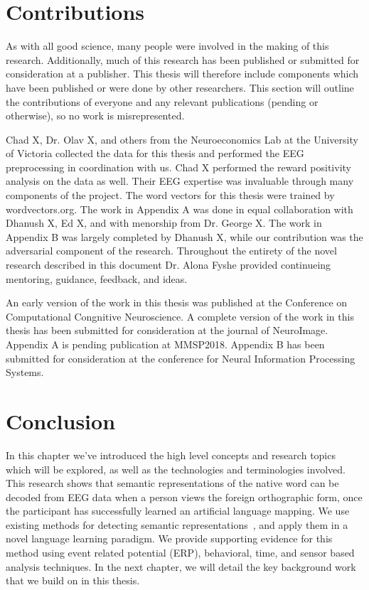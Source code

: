 \section{Contributions}

As with all good science, many people were involved in the making of this 
research. Additionally, much of this research has been published or submitted 
for consideration at a publisher. This thesis will therefore include components 
which have been published or were done by other researchers. This section will 
outline the contributions of everyone and any relevant publications (pending or 
otherwise), so no work is misrepresented.

Chad X, Dr. Olav X, and others from the Neuroeconomics Lab at the University of 
Victoria collected the data for this thesis and performed the EEG preprocessing 
in coordination with us. Chad X performed the reward positivity analysis on the 
data as well. Their EEG expertise was invaluable through many components of the 
project. The word vectors for this thesis were trained by wordvectors.org. The 
work in Appendix A was done in equal collaboration with Dhanush X, Ed X, and 
with menorship from Dr. George X. The work in Appendix B was largely completed 
by Dhanush X, while our contribution was the adversarial component of the 
research. Throughout the entirety of the novel research described in this 
document Dr. Alona Fyshe provided continueing mentoring, guidance, feedback, 
and ideas.

An early version of the work in this thesis was published at the Conference on 
Computational Congnitive Neuroscience. A complete version of the work in this 
thesis has been submitted for consideration at the journal of NeuroImage.  
Appendix A is pending publication at MMSP2018. Appendix B has been submitted 
for consideration at the conference for Neural Information Processing Systems.

\section{Conclusion}

In this chapter we've introduced the high level concepts and research topics 
which will be explored, as well as the technologies and terminologies involved.  
This research shows that semantic representations of the native word can be 
decoded from EEG data when a person views the foreign orthographic form, once 
the participant has successfully learned an artificial language mapping.  We 
use existing methods for detecting semantic representations~\cite{Sudre2012}, 
and apply them in a novel language learning paradigm. We provide supporting 
evidence for this method using event related potential (ERP), behavioral, time, 
and sensor based analysis techniques. In the next chapter, we will detail the 
key background work that we build on in this thesis. 
